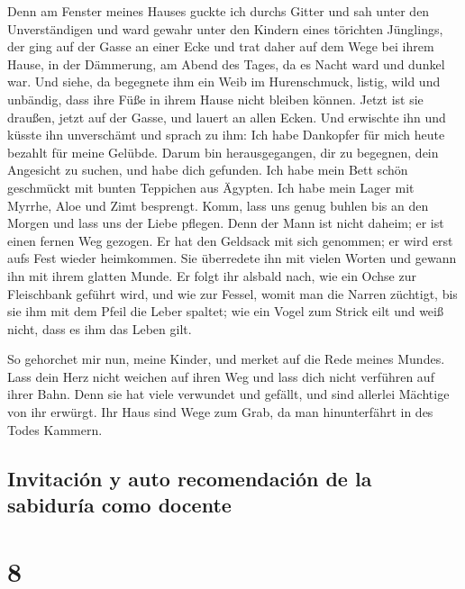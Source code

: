  Denn am Fenster meines Hauses guckte ich durchs Gitter
 und sah unter den Unverständigen und ward gewahr unter
den Kindern eines törichten Jünglings,  der ging auf der
Gasse an einer Ecke und trat daher auf dem Wege bei ihrem Hause,
 in der Dämmerung, am Abend des Tages, da es Nacht ward
und dunkel war.  Und siehe, da begegnete ihm ein Weib im
Hurenschmuck, listig,  wild und unbändig, dass ihre Füße
in ihrem Hause nicht bleiben können.  Jetzt ist sie
draußen, jetzt auf der Gasse, und lauert an allen Ecken. 
Und erwischte ihn und küsste ihn unverschämt und sprach zu ihm:
 Ich habe Dankopfer für mich heute bezahlt für meine
Gelübde.  Darum bin herausgegangen, dir zu begegnen, dein
Angesicht zu suchen, und habe dich gefunden.  Ich habe
mein Bett schön geschmückt mit bunten Teppichen aus Ägypten.
 Ich habe mein Lager mit Myrrhe, Aloe und Zimt besprengt.
 Komm, lass uns genug buhlen bis an den Morgen und lass
uns der Liebe pflegen.  Denn der Mann ist nicht daheim;
er ist einen fernen Weg gezogen.  Er hat den Geldsack mit
sich genommen; er wird erst aufs Fest wieder heimkommen. 
Sie überredete ihn mit vielen Worten und gewann ihn mit ihrem glatten
Munde.  Er folgt ihr alsbald nach, wie ein Ochse zur
Fleischbank geführt wird, und wie zur Fessel, womit man die Narren
züchtigt,  bis sie ihm mit dem Pfeil die Leber spaltet;
wie ein Vogel zum Strick eilt und weiß nicht, dass es ihm das Leben
gilt.

 So gehorchet mir nun, meine Kinder, und merket auf die
Rede meines Mundes.  Lass dein Herz nicht weichen auf
ihren Weg und lass dich nicht verführen auf ihrer Bahn. 
Denn sie hat viele verwundet und gefällt, und sind allerlei Mächtige von
ihr erwürgt.  Ihr Haus sind Wege zum Grab, da man
hinunterfährt in des Todes Kammern.

\hypertarget{invitaciuxf3n-y-auto-recomendaciuxf3n-de-la-sabiduruxeda-como-docente}{%
\subsection{Invitación y auto recomendación de la sabiduría como
docente}\label{invitaciuxf3n-y-auto-recomendaciuxf3n-de-la-sabiduruxeda-como-docente}}

\hypertarget{section-7}{%
\section{8}\label{section-7}}

